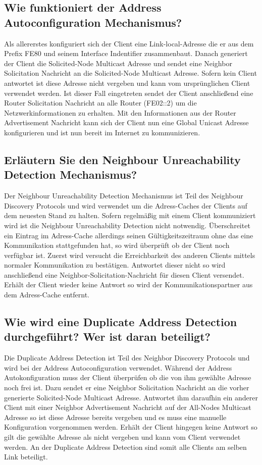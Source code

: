 \documentclass[a4paper,12pt]{article} %
\begin{document}
\subsection{Wie funktioniert der Address Autoconfiguration Mechanismus?}
Als allererstes konfiguriert sich der Client eine Link-local-Adresse die er aus dem Prefix FE80 und seinem Interface Indentifier zusammenbaut. Danach generiert der Client die Solicited-Node Multicast Adresse und sendet eine Neighbor Solicitation Nachricht an die Solicited-Node Multicast Adresse. Sofern kein Client antwortet ist diese Adresse nicht vergeben und kann vom ursprünglichen Client verwendet werden. Ist dieser Fall eingetreten sendet der Client anschließend eine Router Solicitation Nachricht an alle Router (FE02::2) um die Netzwerkinformationen zu erhalten. Mit den Informationen aus der Router Advertisement Nachricht kann sich der Client nun eine Global Unicast Adresse konfigurieren und ist nun bereit im Internet zu kommunizieren. 

\subsection{Erläutern Sie den Neighbour Unreachability Detection Mechanismus?}
Der Neighbour Unreachability Detection Mechanismus ist Teil des Neighbour Discovery Protocols und wird verwendet um die Adress-Caches der Clients auf dem neuesten Stand zu halten. Sofern regelmäßig mit einem Client kommuniziert wird ist die Neighbour Unreachability Detection nicht notwendig. Überschreitet ein Eintrag im Adress-Cache allerdings seinen Gültigkeitszeitraum ohne das eine Kommunikation stattgefunden hat, so wird überprüft ob der Client noch verfügbar ist. Zuerst wird versucht die Erreichbarkeit des anderen Clients mittels normaler Kommunikation zu bestätigen. Antwortet dieser nicht so wird anschließend eine Neighbor-Solicitation-Nachricht für diesen Client versendet. Erhält der Client wieder keine Antwort so wird der Kommunikationspartner aus dem Adress-Cache entfernt.

\subsection{Wie wird eine Duplicate Address Detection durchgeführt? Wer ist daran beteiligt?}
Die Duplicate Address Detection ist Teil des Neighbor Discovery Protocols und wird bei der Address Autoconfiguration verwendet. Während der Address Autokonfiguration muss der Client überprüfen ob die von ihm gewählte Adresse noch frei ist. Dazu sendet er eine Neighbor Solicitation Nachricht an die vorher generierte Solicited-Node Multicast Adresse. Antwortet ihm daraufhin ein anderer Client mit einer Neighbor Advertisement Nachricht auf der All-Nodes Multicast Adresse so ist diese Adresse bereits vergeben und es muss eine manuelle Konfiguration vorgenommen werden. Erhält der Client hingegen keine Antwort so gilt die gewählte Adresse als nicht vergeben und kann vom Client verwendet werden. An der Duplicate Address Detection sind somit alle Clients am selben Link beteiligt.
\end{document}
